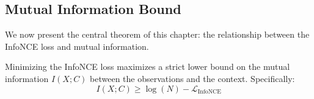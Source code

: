 \subsection{Mutual Information Bound}

We now present the central theorem of this chapter: the relationship between the InfoNCE loss and mutual information.

\begin{theorem}
\label{thm:infonce_bound}
Minimizing the InfoNCE loss maximizes a strict lower bound on the mutual information $I(X; C)$ between the observations and the context. Specifically:
\begin{equation}
    I(X; C) \ge \log(N) - \mathcal{L}_{\text{InfoNCE}}
\end{equation}
\end{theorem}

